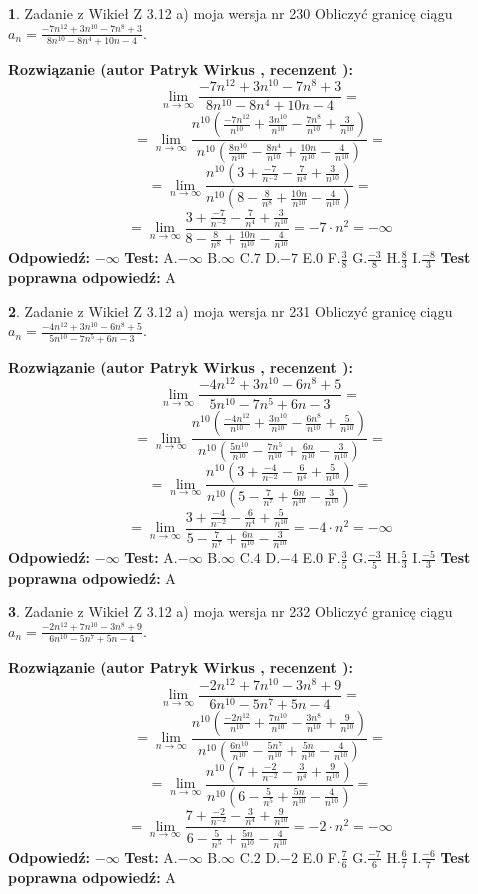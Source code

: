 \documentclass[12pt, a4paper]{article}
\theoremstyle{definition} %
\newtheorem{zad}{}
\newcommand{\zadStart}[1]{\begin{zad}#1\newline}
\newcommand{\zadStop}{\end{zad}}
\newcommand{\rozwStart}[2]{\noindent \textbf{Rozwiązanie (autor #1 , recenzent #2): }\newline}
\newcommand{\rozwStop}{\newline}
\newcommand{\odpStart}{\noindent \textbf{Odpowiedź:}\newline}
\newcommand{\odpStop}{\newline}
\newcommand{\testStart}{\noindent \textbf{Test:}\newline}
\newcommand{\testStop}{\newline}
\newcommand{\kluczStart}{\noindent \textbf{Test poprawna odpowiedź:}\newline}
\newcommand{\kluczStop}{\newline}
\begin{document}
\zadStart{Zadanie z Wikieł Z 3.12 a) moja wersja nr 230}
Obliczyć granicę ciągu $a_{n}=\frac{-7n^{12}+3n^{10}-7n^{8}+3}{8n^{10}-8n^{4}+10n-4}$.
\zadStop
\rozwStart{Patryk Wirkus}{}
$$\lim\limits_{n\to\infty}\frac{-7n^{12}+3n^{10}-7n^{8}+3}{8n^{10}-8n^{4}+10n-4}=$$
$$=\lim\limits_{n\to\infty}\frac{n^{10}\left(\frac{-7n^{12}}{n^{10}}+\frac{3n^{10}}{n^{10}}-\frac{7n^{8}}{n^{10}}+\frac{3}{n^{10}}\right)}{n^{10}\left(\frac{8n^{10}}{n^{10}}-\frac{8n^{4}}{n^{10}}+\frac{10n}{n^{10}}-\frac{4}{n^{10}}\right)}=$$
$$=\lim\limits_{n\to\infty}\frac{n^{10}\left(3+\frac{-7}{n^{-2}}-\frac{7}{n^{4}}+\frac{3}{n^{10}}\right)}
{n^{10}\left(8-\frac{8}{n^{8}}+\frac{10n}{n^{10}}-\frac{4}{n^{10}}\right)}=$$
$$=\lim\limits_{n\to\infty}\frac{3+\frac{-7}{n^{-2}}-\frac{7}{n^{4}}+\frac{3}{n^{10}}}{8-\frac{8}{n^{8}}+\frac{10n}{n^{10}}-\frac{4}{n^{10}}}=-7\cdot n^{2} = -\infty$$
\rozwStop
\odpStart
$-\infty$
\odpStop
\testStart
A.$-\infty$
B.$\infty$
C.$7$
D.$-7$
E.$0$
F.$\frac{3}{8}$
G.$\frac{-3}{8}$
H.$\frac{8}{3}$
I.$\frac{-8}{3}$
\testStop
\kluczStart
A
\kluczStop



\zadStart{Zadanie z Wikieł Z 3.12 a) moja wersja nr 231}
Obliczyć granicę ciągu $a_{n}=\frac{-4n^{12}+3n^{10}-6n^{8}+5}{5n^{10}-7n^{5}+6n-3}$.
\zadStop
\rozwStart{Patryk Wirkus}{}
$$\lim\limits_{n\to\infty}\frac{-4n^{12}+3n^{10}-6n^{8}+5}{5n^{10}-7n^{5}+6n-3}=$$
$$=\lim\limits_{n\to\infty}\frac{n^{10}\left(\frac{-4n^{12}}{n^{10}}+\frac{3n^{10}}{n^{10}}-\frac{6n^{8}}{n^{10}}+\frac{5}{n^{10}}\right)}{n^{10}\left(\frac{5n^{10}}{n^{10}}-\frac{7n^{5}}{n^{10}}+\frac{6n}{n^{10}}-\frac{3}{n^{10}}\right)}=$$
$$=\lim\limits_{n\to\infty}\frac{n^{10}\left(3+\frac{-4}{n^{-2}}-\frac{6}{n^{4}}+\frac{5}{n^{10}}\right)}
{n^{10}\left(5-\frac{7}{n^{7}}+\frac{6n}{n^{10}}-\frac{3}{n^{10}}\right)}=$$
$$=\lim\limits_{n\to\infty}\frac{3+\frac{-4}{n^{-2}}-\frac{6}{n^{4}}+\frac{5}{n^{10}}}{5-\frac{7}{n^{7}}+\frac{6n}{n^{10}}-\frac{3}{n^{10}}}=-4\cdot n^{2} = -\infty$$
\rozwStop
\odpStart
$-\infty$
\odpStop
\testStart
A.$-\infty$
B.$\infty$
C.$4$
D.$-4$
E.$0$
F.$\frac{3}{5}$
G.$\frac{-3}{5}$
H.$\frac{5}{3}$
I.$\frac{-5}{3}$
\testStop
\kluczStart
A
\kluczStop



\zadStart{Zadanie z Wikieł Z 3.12 a) moja wersja nr 232}
Obliczyć granicę ciągu $a_{n}=\frac{-2n^{12}+7n^{10}-3n^{8}+9}{6n^{10}-5n^{7}+5n-4}$.
\zadStop
\rozwStart{Patryk Wirkus}{}
$$\lim\limits_{n\to\infty}\frac{-2n^{12}+7n^{10}-3n^{8}+9}{6n^{10}-5n^{7}+5n-4}=$$
$$=\lim\limits_{n\to\infty}\frac{n^{10}\left(\frac{-2n^{12}}{n^{10}}+\frac{7n^{10}}{n^{10}}-\frac{3n^{8}}{n^{10}}+\frac{9}{n^{10}}\right)}{n^{10}\left(\frac{6n^{10}}{n^{10}}-\frac{5n^{7}}{n^{10}}+\frac{5n}{n^{10}}-\frac{4}{n^{10}}\right)}=$$
$$=\lim\limits_{n\to\infty}\frac{n^{10}\left(7+\frac{-2}{n^{-2}}-\frac{3}{n^{4}}+\frac{9}{n^{10}}\right)}
{n^{10}\left(6-\frac{5}{n^{5}}+\frac{5n}{n^{10}}-\frac{4}{n^{10}}\right)}=$$
$$=\lim\limits_{n\to\infty}\frac{7+\frac{-2}{n^{-2}}-\frac{3}{n^{4}}+\frac{9}{n^{10}}}{6-\frac{5}{n^{5}}+\frac{5n}{n^{10}}-\frac{4}{n^{10}}}=-2\cdot n^{2} = -\infty$$
\rozwStop
\odpStart
$-\infty$
\odpStop
\testStart
A.$-\infty$
B.$\infty$
C.$2$
D.$-2$
E.$0$
F.$\frac{7}{6}$
G.$\frac{-7}{6}$
H.$\frac{6}{7}$
I.$\frac{-6}{7}$
\testStop
\kluczStart
A
\kluczStop
\end{document}

